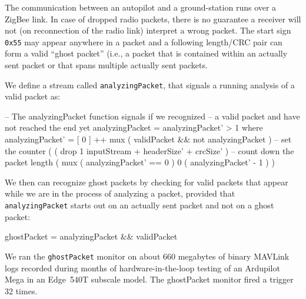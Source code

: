 The communication between an autopilot and a ground-station runs over
a ZigBee link. In case of dropped radio packets, there is no guarantee
a receiver will not (on reconnection of the radio link) interpret a
wrong packet. The start sign {\tt 0x55} may appear anywhere in a
packet and a following length/CRC pair can form a valid ``ghost
packet'' (i.e., a packet that is contained within an actually sent
packet or that spans multiple actually sent packets.

We define a stream called {\tt analyzingPacket}, that signals a running
analysis of a valid packet as:

\begin{code}
-- The analyzingPacket function signals if we recognized
-- a valid packet and have not reached the end yet
analyzingPacket = analyzingPacket' > 1
  where analyzingPacket' = [ 0 ] ++ mux
               ( validPacket && not analyzingPacket )
                -- set the counter
               ( ( drop 1 inputStream
                   + headerSize'
                   + crcSize' )
                 -- count down the packet length
                 ( mux ( analyzingPacket' == 0 )
                     0
                     ( analyzingPacket' - 1 ) )
\end{code}

We then can recognize ghost packets by checking for valid packets that appear
while we are in the process of analyzing a packet, provided that {\tt
  analyzingPacket} starts out on an actually sent packet and not on a ghost
packet:

\begin{code}
ghostPacket = analyzingPacket && validPacket
\end{code}


We ran the {\tt ghostPacket} monitor on about 660 megabytes of
binary MAVLink logs recorded during months of hardware-in-the-loop
testing of an Ardupilot Mega in an Edge~540T subscale model. %
The ghostPacket monitor fired a trigger 32 times.  

